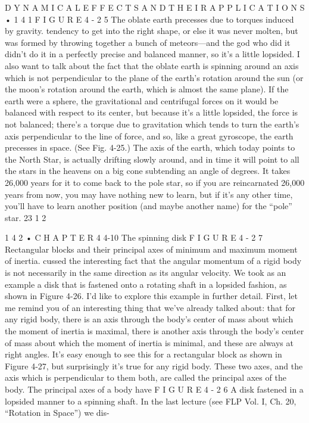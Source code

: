 \documentclass[10pt,oneside]{article}
\begin{document}
D Y N A M I C A L  E F F E C T S  A N D  T H E I R  A P P L I C A T I O N S • 1 4 1 F I G U R E  4 - 2 5 The oblate earth precesses due to torques induced by gravity. tendency to get into the right shape, or else it was never molten, but was formed by throwing together a bunch of meteors---and the god who did it didn’t do it in a perfectly precise and balanced manner, so it’s a little lopsided. I also want to talk about the fact that the oblate earth is spinning around an axis which is not perpendicular to the plane of the earth’s rotation around the sun (or the moon’s rotation around the earth, which is almost the same plane). If the earth were a sphere, the gravitational and centrifugal forces on it would be balanced with respect to its center, but because it’s a little lopsided, the force is not balanced; there’s a torque due to gravitation which tends to turn the earth’s axis perpendicular to the line of force, and so, like a great gyroscope, the earth precesses in space. (See Fig. 4-25.) The axis of the earth, which today points to the North Star, is actually drifting slowly around, and in time it will point to all the stars in the heavens on a big cone subtending an angle of degrees. It takes 26,000 years for it to come back to the pole star, so if you are reincarnated 26,000 years from now, you may have nothing new to learn, but if it’s any other time, you’ll have to learn another position (and maybe another name) for the “pole” star. 23 1 2\par

1 4 2 • C H A P T E R  4 4-10 The spinning disk F I G U R E  4 - 2 7 Rectangular blocks and their principal axes of minimum and maximum moment of inertia. cussed the interesting fact that the angular momentum of a rigid body is not necessarily in the same direction as its angular velocity. We took as an example a disk that is fastened onto a rotating shaft in a lopsided fashion, as shown in Figure 4-26. I’d like to explore this example in further detail. First, let me remind you of an interesting thing that we’ve already talked about: that for any rigid body, there is an axis through the body’s center of mass about which the moment of inertia is maximal, there is another axis through the body’s center of mass about which the moment of inertia is minimal, and these are always at right angles. It’s easy enough to see this for a rectangular block as shown in Figure 4-27, but surprisingly it’s true for any rigid body. These two axes, and the axis which is perpendicular to them both, are called the principal axes of the body. The principal axes of a body have F I G U R E  4 - 2 6 A disk fastened in a lopsided manner to a spinning shaft. In the last lecture (see FLP Vol. I, Ch. 20, “Rotation in Space”) we dis-\par
\end{document}
